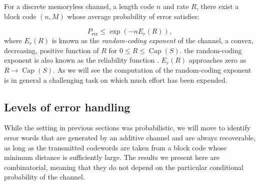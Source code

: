 \indent For a discrete memoryless channel, a length code $n$ and rate $R$, there exist a block code $(n,M)$ whose average probability of error satisfies:

\begin{equation}
P_{\text{err}}\leq \operatorname{exp}(-n E_{r}(R)),
\label{CH2:randomexpoenent}
\end{equation}
where $E_r(R)$ is known as the \textit{random-coding exponent} of the channel, a convex, decreasing, positive function of $R$ for $0\leq R\leq \operatorname{Cap}(S)$. the random-coding exponent is also known as the reliability function \cite{gallager_information_1968, gallager_random_2006}. $E_r(R)$ approaches zero as $R\to  \operatorname{Cap}(S)$. As we will see the computation of the random-coding exponent is in general a challenging task on which much effort has been expended.


\subsection{Levels of error handling}
While the setting in previous sections was probabilistic, we will move to identify error words that are generated by an additive channel and are always recoverable, as long as the transmitted codewords are taken from a block code whose minimum distance is sufficiently large. The results we present here are combinatorial, meaning that they do not depend on the particular conditional probability of the channel.


